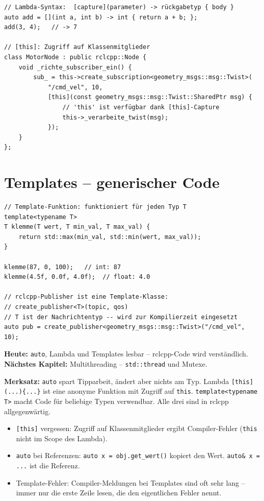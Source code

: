 \begin{lstlisting}[style=cpp]
// Lambda-Syntax:  [capture](parameter) -> rückgabetyp { body }
auto add = [](int a, int b) -> int { return a + b; };
add(3, 4);   // -> 7

// [this]: Zugriff auf Klassenmitglieder
class MotorNode : public rclcpp::Node {
    void _richte_subscriber_ein() {
        sub_ = this->create_subscription<geometry_msgs::msg::Twist>(
            "/cmd_vel", 10,
            [this](const geometry_msgs::msg::Twist::SharedPtr msg) {
                // 'this' ist verfügbar dank [this]-Capture
                this->_verarbeite_twist(msg);
            });
    }
};
\end{lstlisting}

\section{Templates -- generischer Code}

\begin{lstlisting}[style=cpp]
// Template-Funktion: funktioniert für jeden Typ T
template<typename T>
T klemme(T wert, T min_val, T max_val) {
    return std::max(min_val, std::min(wert, max_val));
}

klemme(87, 0, 100);   // int: 87
klemme(4.5f, 0.0f, 4.0f);  // float: 4.0

// rclcpp-Publisher ist eine Template-Klasse:
// create_publisher<T>(topic, qos)
// T ist der Nachrichtentyp -- wird zur Kompilierzeit eingesetzt
auto pub = create_publisher<geometry_msgs::msg::Twist>("/cmd_vel", 10);
\end{lstlisting}

\begin{projektBox}
\textbf{Heute:} \texttt{auto}, Lambda und Templates lesbar --
rclcpp-Code wird verständlich.\\
\textbf{Nächstes Kapitel:} Multithreading -- \texttt{std::thread} und Mutexe.
\end{projektBox}

\begin{merksatzBox}
\textbf{Merksatz:}
\texttt{auto} spart Tipparbeit, ändert aber nichts am Typ.
Lambda \texttt{[this](...)\{...\}} ist eine anonyme Funktion
mit Zugriff auf \texttt{this}.
\texttt{template<typename T>} macht Code für beliebige Typen verwendbar.
Alle drei sind in rclcpp allgegenwärtig.
\end{merksatzBox}

\begin{fehlerBox}
\begin{itemize}
\item \texttt{[this]} vergessen: Zugriff auf Klassenmitglieder
  ergibt Compiler-Fehler (\texttt{this} nicht im Scope des Lambda).
\item \texttt{auto} bei Referenzen:
  \texttt{auto x = obj.get\_wert()} kopiert den Wert.
  \texttt{auto\& x = ...} ist die Referenz.
\item Template-Fehler: Compiler-Meldungen bei Templates sind
  oft sehr lang -- immer nur die erste Zeile lesen,
  die den eigentlichen Fehler nennt.
\end{itemize}
\end{fehlerBox}


